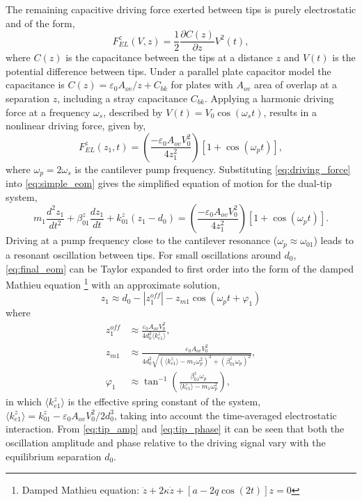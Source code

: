 \documentclass{article}
\begin{document}
The remaining capacitive driving force exerted between tips is purely electrostatic and of the form,
\begin{equation} F_{EL}^z(V,z) = \frac{1}{2} \frac{\partial C(z)}{\partial z} V^2(t), \end{equation}
where $C(z)$ is the capacitance between the tips at a distance $z$ and $V(t)$ is the potential difference between tips. Under a parallel plate capacitor model the capacitance is $C(z) = {\varepsilon_0 A_{ov}}/{z} + C_{bk}$ for plates with $A_{ov}$ area of overlap at a separation $z$, including a stray capacitance $C_{bk}$. Applying a harmonic driving force at a frequency $\omega_s$, described by $V(t)=V_0 \cos(\omega_s t)$, results in a nonlinear driving force, given by,
\begin{equation}
	F_{EL}^z(z_1,t) = \left(\frac{-\varepsilon_0 A_{ov} V_0^2}{4z_1^2}\right)\left[1+\cos(\omega_pt)\right],
	\label{eq:driving_force}
\end{equation}
where $\omega_p = 2\omega_s$ is the cantilever pump frequency.
Substituting \eqref{eq:driving_force} into \eqref{eq:simple_eom} gives the simplified equation of motion for the dual-tip system,
\begin{equation}
m_1 \frac{d^2z_1}{dt^2} + \beta_{01}^z \frac{dz_1}{dt} + k_{01}^z (z_1-d_0) = \left( \frac{-\varepsilon_0 A_{ov} V_0^2}{4z_1^2}\right)\left[1+\cos(\omega_pt)\right].
\label{eq:final_eom}
\end{equation}
Driving at a pump frequency close to the cantilever resonance ($\omega_p \approx \omega_{01}$) leads to a resonant oscillation between tips. For small oscillations around $d_0$, \eqref{eq:final_eom} can be Taylor expanded to first order into the form of the damped Mathieu equation%
\footnote{Damped Mathieu equation: $\ddot{z} + 2\kappa\dot{z} + [a - 2q\cos(2t)]z = 0$}
with an approximate solution,
\begin{equation}
z_1 \approx d_0 - \left|z_{1}^{off}\right| - z_{m1}\cos(\omega_pt+\varphi_1)
\label{eq:tip_oscillation}
\end{equation}
where
\begin{subequations}
\begin{align}
z_1^{off} &\approx %
\frac{ \varepsilon_0 A_{ov} V_0^2 }{ 4d_0^2 \langle k_{e1}^z \rangle }, \label{eq:tip_amp}\\
%
z_{m1} &\approx %
\frac{ \varepsilon_0 A_{ov} V_0^2 }%
{ 4d_0^2 \sqrt{ (\langle k_{e1}^z \rangle - m_1\omega_p^2)^2 + (\beta_{01}^z\omega_p)^2  } }, \\
%
\varphi_1 &\approx \tan^{-1}\left(\frac{\beta_{01}^{z}\omega_{p}}{\langle k_{e1}^{z} \rangle -m_{1}\omega_{p}^{2}}\right), \label{eq:tip_phase}
\end{align}
\end{subequations}
in which $\langle k_{e1}^z \rangle$ is the effective spring constant of the system, $\langle k_{e1}^{z} \rangle = k_{01}^z - {\varepsilon_0 A_{ov} V_0^2}/{2d_0^3}$, taking into account the time-averaged electrostatic interaction. From \eqref{eq:tip_amp} and \eqref{eq:tip_phase} it can be seen that both the oscillation amplitude and phase relative to the driving signal vary with the equilibrium separation $d_0$.
\end{document}
